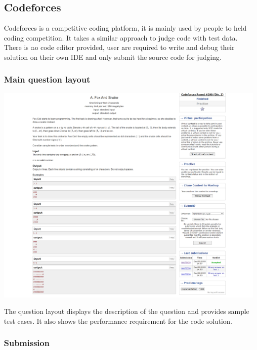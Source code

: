 \documentclass[a4paper]{report}
\begin{document}
\subsection{Codeforces}

Codeforces is a competitive coding platform, it is mainly used by people to held coding competition. It takes a similar approach to judge code with test data. There is no code editor provided, user are required to write and debug their solution on their own IDE and only submit the source code for judging.

\subsubsection{Main question layout}

\includegraphics[width=\linewidth]{Problem-A-Codeforces}

The question layout displays the description of the question and provides sample test cases. It also shows the performance requirement for the code solution.

\subsubsection{Submission}
\end{document}
